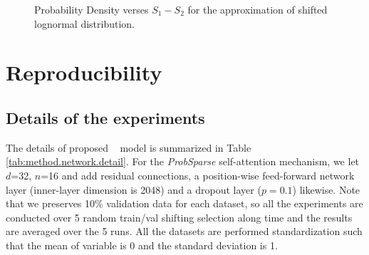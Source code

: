 \begin{appendices}
\begin{figure}
    \centering
    \caption{Probability Density verses $S_1-S_2$ for the approximation of  shifted lognormal distribution.}
    \label{fig:appendix.examples}
\end{figure}

\section{Reproducibility}
\subsection{Details of the experiments}
\label{sec:appendix.network}
The details of proposed \mn~ model is summarized in Table \ref{tab:method.network.detail}. For the \emph{ProbSparse} self-attention mechanism, we let $d$=32, $n$=16 and add residual connections, a position-wise feed-forward network layer (inner-layer dimension is 2048) and a dropout layer ($p=0.1$) likewise. Note that we preserves 10\% validation data for each dataset, so all the experiments are conducted over 5 random train/val shifting selection along time and the results are averaged over the 5 runs. All the datasets are performed standardization such that the mean of variable is 0 and the standard deviation is 1.


\end{appendices}
